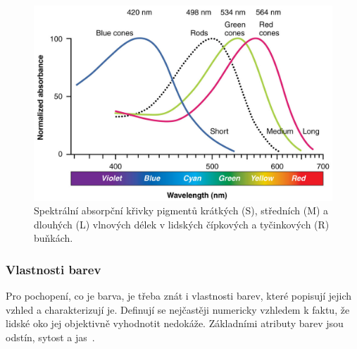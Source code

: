 \begin{figure}[!htbp]
    \centering
    \includegraphics[width=0.7\linewidth]{images/Color_Sensitivity.jpg}
    \caption{Spektrální absorpční křivky pigmentů krátkých (S), středních (M) a dlouhých (L) vlnových délek v lidských čípkových a tyčinkových (R) buňkách.~\cite{cone-response}}
    \label{fig:Spektrální křivky}
\end{figure}


\subsubsection{Vlastnosti barev}
Pro pochopení, co je barva, je třeba znát i vlastnosti barev, které popisují jejich vzhled a charakterizují je. Definují se nejčastěji numericky vzhledem k faktu,
že lidské oko jej objektivně vyhodnotit nedokáže. Základními atributy barev jsou odstín, sytost a jas~\cite{jelen2023vliv_barev}.

